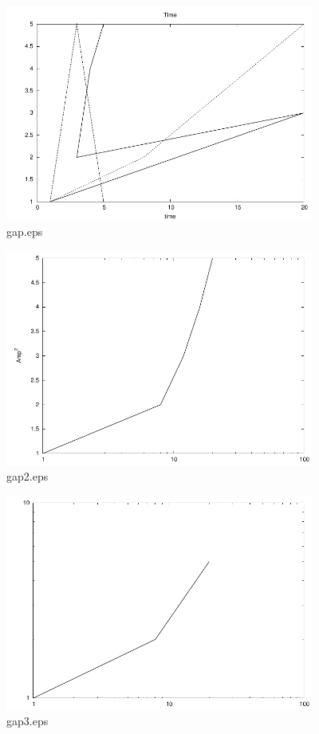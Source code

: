 \documentclass{article}
\begin{document}
\begin{figure}[htbp]
\begin{center}
\includegraphics[width=4in]{gap}
\caption{gap.eps}
\label{fig:gap.eps}
\end{center}
\end{figure}
\begin{figure}[htbp]
\begin{center}
\includegraphics[width=4in]{gap2}
\caption{gap2.eps}
\label{fig:gap2.eps}
\end{center}
\end{figure}


\begin{figure}[htbp]
\begin{center}
\includegraphics[width=4in]{gap3}
\caption{gap3.eps}
\label{fig:gap2.eps}
\end{center}
\end{figure}
\end{document}
